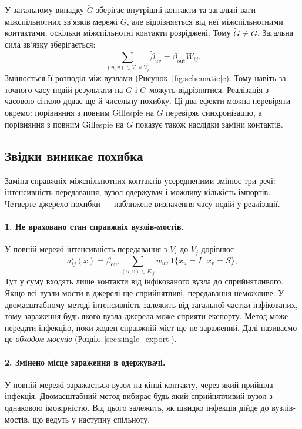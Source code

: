 \documentclass[a4paper,fleqn]{cas-sc}
\newcommand{\ind}{\mathbf{1}}
\begin{document}
У загальному випадку $\tilde G$ зберігає внутрішні контакти та загальні ваги міжспільнотних зв’язків мережі $G$, але відрізняється від неї міжспільнотними контактами, оскільки міжспільнотні контакти розріджені. Тому $\tilde G\neq G$.
Загальна сила зв'язку зберігається:
\[
\sum_{(u,v)\in V_i\times V_j}\tilde\beta_{uv}=\beta_{\mathrm{out}}W_{ij}.
\]
Змінюється її розподіл між вузлами (Рисунок~\ref{fig:schematic}c). Тому навіть за точного часу подій результати на $G$ і $\tilde G$ можуть відрізнятися. Реалізація з часовою сіткою додає ще й чисельну похибку. Ці два ефекти можна перевіряти окремо: порівняння з повним Gillespie на $\tilde G$ перевіряє синхронізацію, а порівняння з повним Gillespie на $G$ показує також наслідки заміни контактів.

\subsection{Звідки виникає похибка}
\label{sec:sources}

Заміна справжніх міжспільнотних контактів усередненими змінює три речі: інтенсивність передавання, вузол-одержувач і можливу кількість імпортів. Четверте джерело похибки --- наближене визначення часу подій у реалізації.

\paragraph{1. Не враховано стан справжніх вузлів-мостів.}
У повній мережі інтенсивність передавання з $V_i$ до $V_j$ дорівнює
\begin{equation}
\label{eq:exact_rate}
a^\star_{ij}(x)=\beta_{\mathrm{out}}\sum_{(u,v)\in E_{ij}}w_{uv}\,\ind\{x_u=I,\,x_v=S\},
\end{equation}
Тут у суму входять лише контакти від інфікованого вузла до сприйнятливого. Якщо всі вузли-мости в джерелі ще сприйнятливі, передавання неможливе. У двомасштабному методі інтенсивність залежить від загальної частки інфікованих, тому зараження будь-якого вузла джерела може сприяти експорту. Метод може передати інфекцію, поки жоден справжній міст ще не заражений. Далі називаємо це \emph{обходом мостів} (Розділ~\ref{sec:single_export}).

\paragraph{2. Змінено місце зараження в одержувачі.}
У повній мережі заражається вузол на кінці контакту, через який прийшла інфекція. Двомасштабний метод вибирає будь-який сприйнятливий вузол з однаковою імовірністю. Від цього залежить, як швидко інфекція дійде до вузлів-мостів, що ведуть у наступну спільноту.
\end{document}
